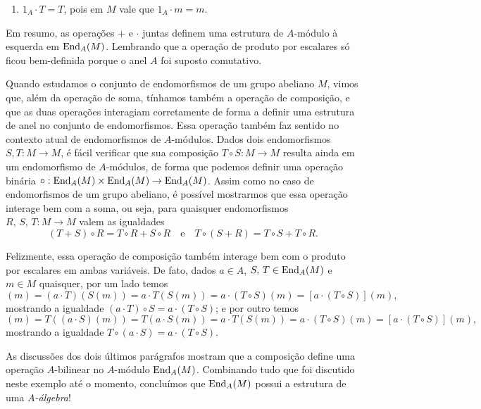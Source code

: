 \begin{exem}
\begin{enumerate}
  \item $1_A \cdot T = T$, pois em $M$ vale que $1_A \cdot m = m$.
  \end{enumerate}
  Em resumo, as operações $+$ e $\cdot$ juntas definem uma estrutura de $A$-módulo à esquerda em $\mathrm{End}_{A}(M)$.
  Lembrando que a operação de produto por escalares só ficou bem-definida porque o anel $A$ foi suposto comutativo.

  Quando estudamos o conjunto de endomorfismos de um grupo abeliano $M$, vimos que, além da operação de soma, tínhamos também a operação de composição, e que as duas operações interagiam corretamente de forma a definir uma estrutura de anel no conjunto de endomorfismos.
  Essa operação também faz sentido no contexto atual de endomorfismos de $A$-módulos.
  Dados dois endomorfismos $S,T: M \to M$, é fácil verificar que sua composição $T \circ S: M \to M$ resulta ainda em um endomorfismo de $A$-módulos, de forma que podemos definir uma operação binária $\circ: \mathrm{End}_{A}(M) \times \mathrm{End}_{A}(M) \to \mathrm{End}_{A}(M)$.
  Assim como no caso de endomorfismos de um grupo abeliano, é possível mostrarmos que essa operação interage bem com a soma, ou seja, para quaisquer endomorfismos $R,\,S,\, T: M \to M$ valem as igualdades
  \begin{displaymath}
    (T + S) \circ R = T \circ R + S \circ R \quad \text{e} \quad T \circ (S+R) = T \circ S + T \circ R.
  \end{displaymath}

  Felizmente, essa operação de composição também interage bem com o produto por escalares em ambas variáveis.
  De fato, dados $a \in A$, $S,\, T \in \mathrm{End}_{A}(M)$ e $m \in M$ quaisquer, por um lado temos
  \begin{displaymath}
    [(a \cdot T) \circ S](m) = (a \cdot T)(S(m)) = a \cdot T(S(m)) = a \cdot (T \circ S)(m) = [a \cdot (T \circ S)](m),
  \end{displaymath}
  mostrando a igualdade $(a \cdot T) \circ S = a \cdot (T \circ S)$; e por outro temos
  \begin{displaymath}
    [T \circ (a \cdot S)](m) = T((a \cdot S)(m)) = T(a \cdot S(m)) = a \cdot T(S(m)) = a \cdot (T \circ S)(m) = [a \cdot (T \circ S)](m),
  \end{displaymath}
  mostrando a igualdade $T \circ (a \cdot S) = a \cdot (T \circ S)$.

  As discussões dos dois últimos parágrafos mostram que a composição define uma operação $A$-bilinear no $A$-módulo $\mathrm{End}_{A}(M)$.
  Combinando tudo que foi discutido neste exemplo até o momento, concluímos que $\mathrm{End}_{A}(M)$ possui a estrutura de uma \emph{$A$-álgebra}!


\end{exem}
